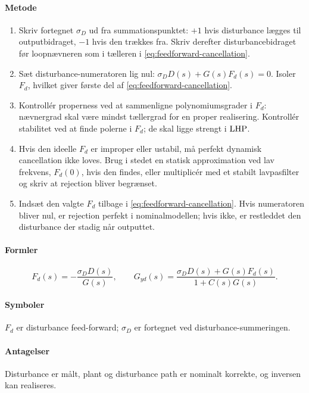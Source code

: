 \paragraph{Metode}
\begin{enumerate}
\item Skriv fortegnet \(\sigma_D\) ud fra summationspunktet: \(+1\) hvis disturbance
      lægges til outputbidraget, \(-1\) hvis den trækkes fra. Skriv derefter
      disturbancebidraget før loopnævneren som i tælleren i
      \eqref{eq:feedforward-cancellation}.
\item Sæt disturbance-numeratoren lig nul:
      \(\sigma_DD(s)+G(s)F_d(s)=0\). Isoler \(F_d\), hvilket giver første del af
      \eqref{eq:feedforward-cancellation}.
\item Kontrollér properness ved at sammenligne polynomiumsgrader i \(F_d\): nævnergrad
      skal være mindst tællergrad for en proper realisering. Kontrollér stabilitet ved
      at finde polerne i \(F_d\); de skal ligge strengt i \(\mathrm{LHP}\).
\item Hvis den ideelle \(F_d\) er improper eller ustabil, må perfekt dynamisk
      cancellation ikke loves. Brug i stedet en statisk approximation ved lav frekvens,
      \(F_d(0)\), hvis den findes, eller multiplicér med et stabilt lavpasfilter og
      skriv at rejection bliver begrænset.
\item Indsæt den valgte \(F_d\) tilbage i \eqref{eq:feedforward-cancellation}. Hvis
      numeratoren bliver nul, er rejection perfekt i nominalmodellen; hvis ikke, er
      restleddet den disturbance der stadig når outputtet.
\end{enumerate}

\paragraph{Formler}
\begin{equation}
\label{eq:feedforward-cancellation}
F_d(s)=-\frac{\sigma_DD(s)}{G(s)},\qquad
G_{yd}(s)=\frac{\sigma_DD(s)+G(s)F_d(s)}{1+C(s)G(s)}.
\end{equation}

\paragraph{Symboler}
\(F_d\) er disturbance feed-forward; \(\sigma_D\) er fortegnet ved disturbance-summeringen.

\paragraph{Antagelser}
Disturbance er målt, plant og disturbance path er nominalt korrekte, og inversen kan
realiseres.

